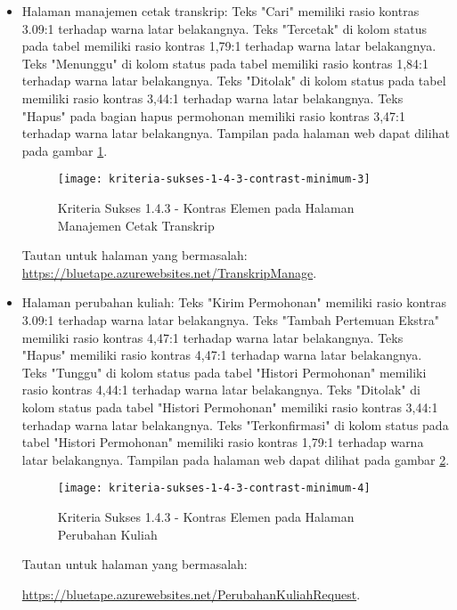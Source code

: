 \begin{itemize}
    \item Halaman manajemen cetak transkrip: Teks "Cari" memiliki rasio kontras 3.09:1 terhadap warna latar belakangnya. Teks "Tercetak" di kolom status pada tabel memiliki rasio kontras 1,79:1 terhadap warna latar belakangnya. Teks "Menunggu" di kolom status pada tabel memiliki rasio kontras 1,84:1 terhadap warna latar belakangnya. Teks "Ditolak" di kolom status pada tabel memiliki rasio kontras 3,44:1 terhadap warna latar belakangnya. Teks "Hapus" pada bagian hapus permohonan memiliki rasio kontras 3,47:1 terhadap warna latar belakangnya. Tampilan pada halaman web dapat dilihat pada gambar \ref{fig:1.4.3_contrast_minimum_3}.
    \begin{figure}[H]
        \centering  
        \texttt{[image: kriteria-sukses-1-4-3-contrast-minimum-3]}  
        \caption[Kriteria Sukses 1.4.3 - Kontras Elemen pada Halaman Manajemen Cetak Transkrip]{Kriteria Sukses 1.4.3 - Kontras Elemen pada Halaman Manajemen Cetak Transkrip}
        \label{fig:1.4.3_contrast_minimum_3}  
    \end{figure} 
    Tautan untuk halaman yang bermasalah: \url{https://bluetape.azurewebsites.net/TranskripManage}.

    \item Halaman perubahan kuliah: Teks "Kirim Permohonan" memiliki rasio kontras 3.09:1 terhadap warna latar belakangnya. Teks "Tambah Pertemuan Ekstra" memiliki rasio kontras 4,47:1 terhadap warna latar belakangnya. Teks "Hapus" memiliki rasio kontras 4,47:1 terhadap warna latar belakangnya. Teks "Tunggu" di kolom status pada tabel "Histori Permohonan" memiliki rasio kontras 4,44:1 terhadap warna latar belakangnya. Teks "Ditolak" di kolom status pada tabel "Histori Permohonan" memiliki rasio kontras 3,44:1 terhadap warna latar belakangnya. Teks "Terkonfirmasi" di kolom status pada tabel "Histori Permohonan" memiliki rasio kontras 1,79:1 terhadap warna latar belakangnya. Tampilan pada halaman web dapat dilihat pada gambar \ref{fig:1.4.3_contrast_minimum_4}.
    \begin{figure}[H]
        \centering  
        \texttt{[image: kriteria-sukses-1-4-3-contrast-minimum-4]}  
        \caption[Kriteria Sukses 1.4.3 - Kontras Elemen pada Halaman Perubahan Kuliah]{Kriteria Sukses 1.4.3 - Kontras Elemen pada Halaman Perubahan Kuliah}
        \label{fig:1.4.3_contrast_minimum_4}  
    \end{figure} 
    Tautan untuk halaman yang bermasalah: 

    \url{https://bluetape.azurewebsites.net/PerubahanKuliahRequest}.
    

\end{itemize}
